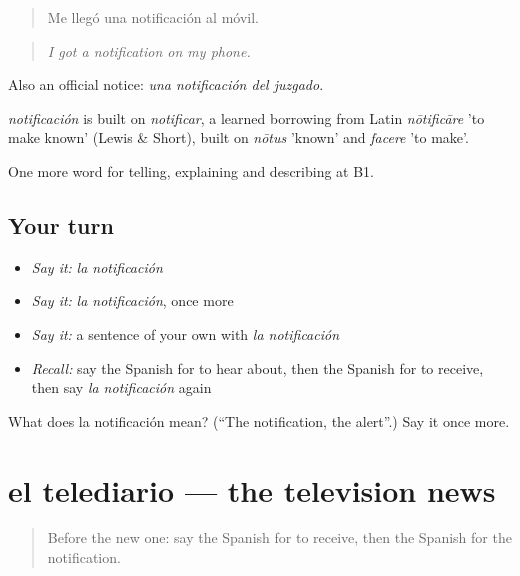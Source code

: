 \begin{quote}
Me llegó una notificación al móvil.
\end{quote}

\begin{quote}
\emph{I got a notification on my phone.}
\end{quote}

Also an official notice: \emph{una notificación del juzgado}.

\begin{cousinweb}
\emph{notificación} is built on \emph{notificar}, a learned borrowing from Latin \emph{nōtificāre} 'to make known' (Lewis \& Short), built on \emph{nōtus} 'known' and \emph{facere} 'to make'.
\end{cousinweb}

\begin{grammarlens}[title={What you've built}]
One more word for telling, explaining and describing at B1.
\end{grammarlens}

\subsection*{Your turn}
\begin{itemize}
\raggedright
  \item \emph{Say it:} \emph{la notificación}
  \item \emph{Say it:} \emph{la notificación}, once more
  \item \emph{Say it:} a sentence of your own with \emph{la notificación}
  \item \emph{Recall:} say the Spanish for to hear about, then the Spanish for to receive, then say \emph{la notificación} again
\end{itemize}

\begin{tcolorbox}[breakable,colback=teal!4,colframe=teal!35!black,title={Before you move on}]
What does la notificación mean? (\textquotedblleft{}The notification, the alert\textquotedblright{}.) Say it once more.
\end{tcolorbox}
\section[el telediario]{el telediario — the television news}

\label{lesson:ES-C574-telediario}



\begin{quote}
Before the new one: say the Spanish for to receive, then the Spanish for the notification.
\end{quote}

